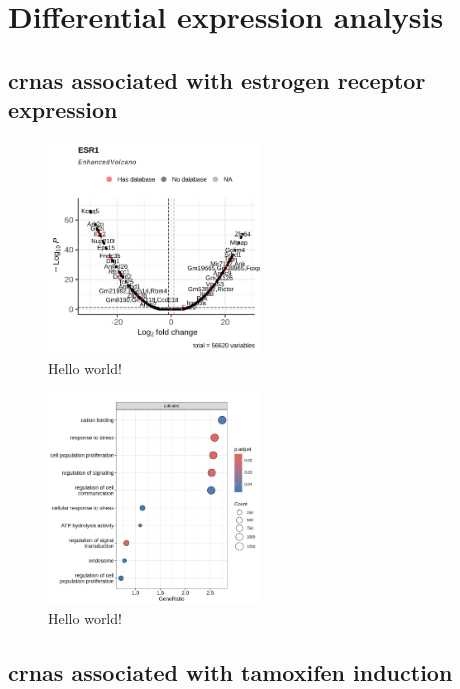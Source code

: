 \section{Differential expression analysis}

\subsection{\Glspl{crna} associated with estrogen receptor expression}

\begin{figure}[ht]
    \centering

    \includegraphics[width=0.5\textwidth]{chapters/4_results_and_discussion/figures/dea/deseq2/esr1/volcano.png}
    \caption{Hello world!
    }
    \label{fig:esr1_volcano}
\end{figure}

\begin{figure}[ht]
    \centering

    \includegraphics[width=0.5\textwidth]{chapters/4_results_and_discussion/figures/dea/deseq2/esr1/dot.png}
    \caption{Hello world!
    }
    \label{fig:go_terms}
\end{figure}

\subsection{\Glspl{crna} associated with tamoxifen induction}


